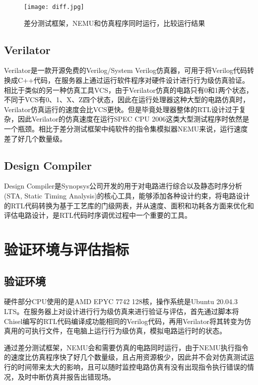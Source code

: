 \begin{figure}[htb]
	\centering
	\setlength\tabcolsep{3pt}  %
	\vspace{5pt} %
	\texttt{[image: diff.jpg]}
	\caption{差分测试框架，NEMU和仿真程序同时运行，比较运行结果}
	\label{fig:figure65}
\end{figure}

\subsection{Verilator}

Verilator\cite{verilator}是一款开源免费的Verilog/System Verilog仿真器，可用于将Verilog代码转换成C++代码，在服务器上通过运行软件程序对硬件设计进行行为级仿真验证。相比于类似的另一种仿真工具VCS\cite{vcs}，由于Verilator仿真的电路只有0和1两个状态，不同于VCS有0、1、X、Z四个状态，因此在运行处理器这种大型的电路仿真时，Verilator仿真运行的速度会比VCS更快。但是毕竟处理器整体的RTL设计过于复杂，因此Verilator的仿真速度在运行SPEC CPU 2006这类大型测试程序时依然是一个瓶颈。相比于差分测试框架中纯软件的指令集模拟器NEMU来说，运行速度差了好几个数量级。

\subsection{Design Compiler}

Design Compiler是Synopsys公司开发的用于对电路进行综合以及静态时序分析 (STA, Static Timing Analysis)的核心工具，能够添加各种设计约束，将电路设计的RTL代码转换为基于工艺库的门级网表，并从速度、面积和功耗各方面来优化和评估电路设计，是RTL代码时序调优过程中一个重要的工具。

\section{验证环境与评估指标}

\subsection{验证环境}

硬件部分CPU使用的是AMD EPYC 7742 128核，操作系统是Ubuntu 20.04.3 LTS。在服务器上对设计进行行为级仿真来进行验证与评估，首先通过脚本将Chisel编写的RTL代码编译成功能相同的Verilog代码，再用Verilator将其转变为仿真用的可执行文件，在电脑上运行行为级仿真，模拟电路运行时的状态。

通过差分测试框架，NEMU会和需要仿真的电路同时运行，由于NEMU执行指令的速度比仿真程序快了好几个数量级，且占用资源极少，因此并不会对仿真测试运行的时间带来太大的影响，且可以随时监控电路仿真有没有出现指令执行错误的情况，及时中断仿真并报告出错现场。

